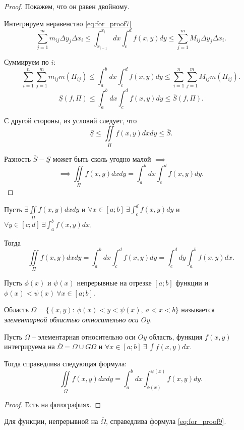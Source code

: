 \begin{proof}
    Покажем, что он равен двойному.

    Интегрируем неравенство \ref{eq:for_proof7}
    \[
        \sum_{j=1}^{m}m_{ij}\Delta y_j\Delta x_i \leqslant \int_{x_{i-1}}^{x_i}dx \int_{c}^{d}f(x,y)dy \leqslant \sum_{j=1}^{m}M_{ij}\Delta y_j \Delta x_i.
    \]

    Суммируем по $ i $:
    \[
        \sum_{i=1}^{n}\sum_{j=1}^{m}m_{ij} m(\Pi_{ij}) \leqslant \int_{a}^{b}dx \int_{c}^{d} f(x,y)dy \leqslant \sum_{i=1}^{n}\sum_{j=1}^{m}M_{ij}m(\Pi_{ij}).
    \]
    \[
        \underline{S}(f,\Pi) \leqslant \int_{a}^{b}dx \int_{c}^{d}f(x,y)dy \leqslant \overline{S}(f,\Pi).
    \]

    С другой стороны, из условий следует, что
    \[
        \underline{S} \leqslant \iint\limits_\Pi f(x,y)dxdy \leqslant \overline{S}.
    \]

    Разность $ \overline{S} - \underline{S} $ может быть сколь угодно малой $ \implies $
    \[
        \implies \iint\limits_\Pi f(x,y)dxdy = \int_{a}^{b}dx \int_{c}^{d}f(x,y)dy.
    \]
\end{proof}

\begin{corollary}
    Пусть $ \exists \iint\limits_\Pi f(x,y)dxdy $ и $ \forall x \in [a;b] \ \exists \int_{c}^{d}f(x,y)dy $ и $ \forall y \in [c;d] \ \exists \int_{a}^{b}f(x,y)dx $.

    Тогда
    \[
        \iint\limits_\Pi f(x,y)dxdy = \int_{a}^{b}dx \int_{c}^{d}f(x,y)dy = \int_{c}^{d}dy \int_{a}^{b}f(x,y)dx.
    \]
\end{corollary}

\begin{definition}
    Пусть $ \phi(x) $ и $ \psi(x) $ непрерывные на отрезке $ [a;b] $ функции и $ \phi(x) < \psi(x) \ \forall x \in[a;b] $.

    Область $ \Omega = \big\{(x,y): \ \phi(x) < y < \psi(x), \ a < x < b \big\} $ называется \emph{элементарной областью относительно оси $ Oy $}.
\end{definition}

\begin{theorem}
    Пусть $ \Omega $ -- элементарная относительно оси $ Oy $ область, функция $ f(x,y) $ интегрируема на $ \overline{\Omega} = \Omega \cup G\Omega $ и $ \forall x \in [a;b] \ \exists \ \int f(x,y)dx $.

    Тогда справедлива следующая формула:
    \begin{equation}\label{eq:for_proof9}
        \iint\limits_\Omega f(x,y)dxdy = \int_{a}^{b}dx \int_{\phi(x)}^{\psi(x)}f(x,y)dy.
    \end{equation}
\end{theorem}

\begin{proof}
    Есть на фотографиях.
\end{proof}

\begin{corollary}
    Для функции, непрерывной на $ \overline{\Omega} $, справедлива формула \ref{eq:for_proof9}.
\end{corollary}